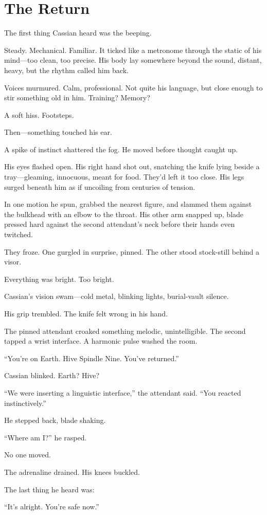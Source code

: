 \chapter{The Return}

The first thing Cassian heard was the beeping.

Steady. Mechanical. Familiar. It ticked like a metronome through the static of his mind—too clean, too precise. His body lay somewhere beyond the sound, distant, heavy, but the rhythm called him back.

Voices murmured. Calm, professional. Not quite his language, but close enough to stir something old in him. Training? Memory?

A soft hiss. Footsteps.

Then—something touched his ear.

A spike of instinct shattered the fog. He moved before thought caught up.

His eyes flashed open. His right hand shot out, snatching the knife lying beside a tray—gleaming, innocuous, meant for food. They'd left it too close. His legs surged beneath him as if uncoiling from centuries of tension.

In one motion he spun, grabbed the nearest figure, and slammed them against the bulkhead with an elbow to the throat. His other arm snapped up, blade pressed hard against the second attendant’s neck before their hands even twitched.

They froze. One gurgled in surprise, pinned. The other stood stock-still behind a visor.

Everything was bright. Too bright.

Cassian’s vision swam—cold metal, blinking lights, burial-vault silence.

His grip trembled. The knife felt wrong in his hand.

The pinned attendant croaked something melodic, unintelligible. The second tapped a wrist interface. A harmonic pulse washed the room.

“You’re on Earth. Hive Spindle Nine. You’ve returned.”

Cassian blinked. Earth? Hive?

“We were inserting a linguistic interface,” the attendant said. “You reacted instinctively.”

He stepped back, blade shaking.

“Where am I?” he rasped.

No one moved.

The adrenaline drained. His knees buckled.

The last thing he heard was:

“It’s alright. You’re safe now.”
